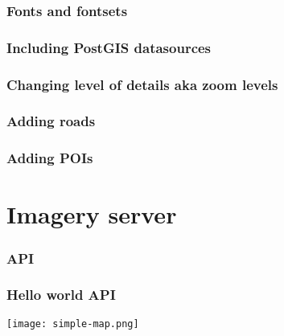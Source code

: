 \documentclass{beamer}
\begin{document}
\begin{frame}
  \frametitle{Fonts and fontsets}

\end{frame}

\begin{frame}
  \frametitle{Including PostGIS datasources}

\end{frame}

\begin{frame}
  \frametitle{Changing level of details aka zoom levels}

\end{frame}

\begin{frame}
  \frametitle{Adding roads}

\end{frame}


\begin{frame}
  \frametitle{Adding POIs}

\end{frame}


\section{Imagery server}

\begin{frame}
  \frametitle{API}

\end{frame}

\begin{frame}[fragile]
  \frametitle{Hello world API}
  \begin{centering}
    \texttt{[image: simple-map.png]}
  \end{centering}
\end{frame}






\end{document}
